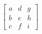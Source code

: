 \documentclass[preview]{standalone}
\begin{document}
\begin{align*}
\begin{bmatrix} a & d & g \\ b & e & h \\ c & f & i \end{bmatrix}
\end{align*}
\end{document}
